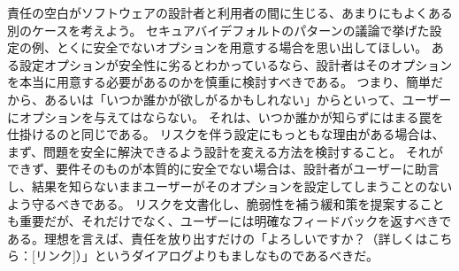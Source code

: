 \documentclass[uplatex]{jsarticle}
\begin{document}
責任の空白がソフトウェアの設計者と利用者の間に生じる、あまりにもよくある別のケースを考えよう。
セキュアバイデフォルトのパターンの議論で挙げた設定の例、とくに安全でないオプションを用意する場合を思い出してほしい。
ある設定オプションが安全性に劣るとわかっているなら、設計者はそのオプションを本当に用意する必要があるのかを慎重に検討すべきである。
つまり、簡単だから、あるいは「いつか誰かが欲しがるかもしれない」からといって、ユーザーにオプションを与えてはならない。
それは、いつか誰かが知らずにはまる罠を仕掛けるのと同じである。
リスクを伴う設定にもっともな理由がある場合は、まず、問題を安全に解決できるよう設計を変える方法を検討すること。
それができず、要件そのものが本質的に安全でない場合は、設計者がユーザーに助言し、結果を知らないままユーザーがそのオプションを設定してしまうことのないよう守るべきである。
リスクを文書化し、脆弱性を補う緩和策を提案することも重要だが、それだけでなく、ユーザーには明確なフィードバックを返すべきである。理想を言えば、責任を放り出すだけの「よろしいですか？（詳しくはこちら：[リンク]）」というダイアログよりもましなものであるべきだ。
\end{document}
